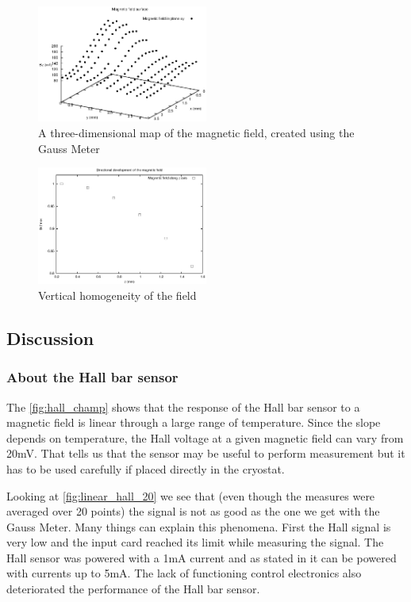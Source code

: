 \documentclass[journal]{IEEEtran}
\begin{document}
\begin{figure}[h]
\centering

\includegraphics[width=0.5\textwidth]{cartographie_champ.eps}
\caption{A three-dimensional map of the magnetic field, created using the Gauss Meter}
\label{fig:map}
\end{figure}

\begin{figure}[h]
\centering

\includegraphics[width=0.5\textwidth]{cartographie_champ_z.eps}
\caption{Vertical homogeneity of the field}
\label{fig:homo_z}
\end{figure}

\subsection{Discussion}

\subsubsection{About the Hall bar sensor}

The \figurename \ref{fig:hall_champ} shows that the response of the Hall bar sensor to a magnetic field is linear through a large range of temperature. Since the slope depends on temperature, the Hall voltage at a given magnetic field can vary from 20mV. That tells us that the sensor may be useful to perform measurement but it has to be used carefully if placed directly in the cryostat.

Looking at \figurename \ref{fig:linear_hall_20} we see that (even though the measures were averaged over 20 points) the signal is not as good as the one we get with the Gauss Meter. Many things can explain this phenomena. First the Hall signal is very low and the input card reached its limit while measuring the signal. The Hall sensor was powered with a 1mA current and as stated in \cite{toshiba} it can be powered with currents up to 5mA. The lack of functioning control electronics also deteriorated the performance of the Hall bar sensor. 
\end{document}

